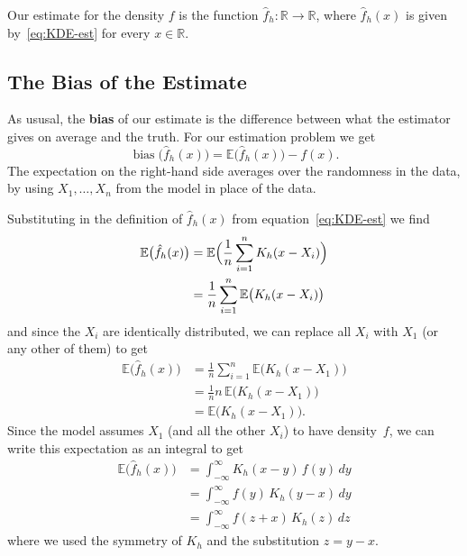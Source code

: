 \documentclass[
  a4paper,
]{article}
\theoremstyle{definition}
\theoremstyle{definition}
\theoremstyle{definition}
\theoremstyle{definition}
\theoremstyle{remark}
\begin{document}
Our estimate for the density \(f\) is the function \(\hat f_h\colon \mathbb{R}\to \mathbb{R}\),
where \(\hat f_h(x)\) is given by~\eqref{eq:KDE-est} for every \(x \in\mathbb{R}\).

\hypertarget{the-bias-of-the-estimate}{%
\subsection{The Bias of the Estimate}\label{the-bias-of-the-estimate}}

As ususal, the \textbf{bias} of our estimate is the difference between
what the estimator gives on average and the truth. For our estimation
problem we get
\begin{equation*}
    \mathop{\mathrm{bias}}\bigl(\hat f_h(x)\bigr)
    = \mathbb{E}\bigl(\hat f_h(x)\bigr) - f(x).
\end{equation*}
The expectation on the right-hand side averages over the randomness
in the data, by using \(X_1, \ldots, X_n\) from the model in place of
the data.

Substituting in the definition of \(\hat f_h(x)\) from equation~\eqref{eq:KDE-est}
we find
\begin{align*}
    \mathbb{E}\bigl(\hat f_h(x)\bigr)
    &= \mathbb{E}\Bigl( \frac{1}{n} \sum_{i=1}^n K_h(x - X_i) \Bigr) \\
    &= \frac{1}{n} \sum_{i=1}^n \mathbb{E}\bigl( K_h(x - X_i) \bigr)
\end{align*}
and since the \(X_i\) are identically distributed, we can replace
all \(X_i\) with \(X_1\) (or any other of them) to get
\begin{align*}
    \mathbb{E}\bigl(\hat f_h(x)\bigr)
    &= \frac{1}{n} \sum_{i=1}^n \mathbb{E}\bigl( K_h(x - X_1) \bigr) \\
    &= \frac{1}{n} n \, \mathbb{E}\bigl( K_h(x - X_1) \bigr) \\
    &= \mathbb{E}\bigl( K_h(x - X_1) \bigr).
\end{align*}
Since the model assumes \(X_1\) (and all the other \(X_i\)) to have density~\(f\),
we can write this expectation as an integral to get
\begin{align*}
    \mathbb{E}\bigl(\hat f_h(x)\bigr)
    &= \int_{-\infty}^\infty K_h(x - y) \, f(y) \, dy \\
    &= \int_{-\infty}^\infty f(y) \, K_h(y - x) \, dy \\
    &= \int_{-\infty}^\infty f(z+x) \, K_h(z) \, dz
\end{align*}
where we used the symmetry of \(K_h\) and the substitution \(z = y - x\).
\end{document}
